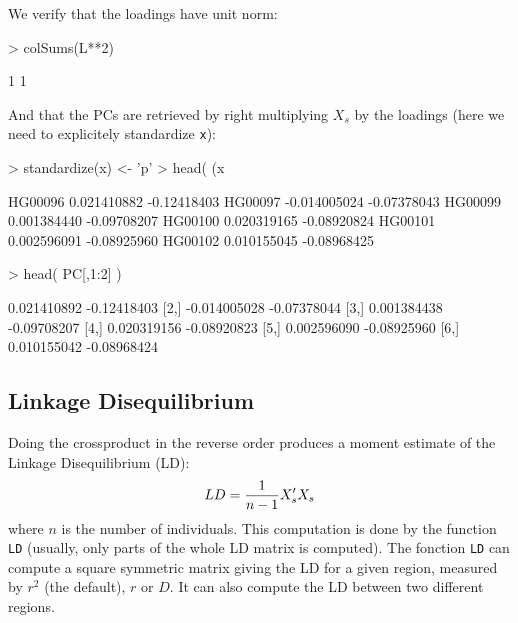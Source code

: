 \documentclass{article}
\renewenvironment{Schunk}{\vspace{\topsep}}{\vspace{\topsep}}
\begin{document}
We verify that the loadings have unit norm:
\begin{Schunk}
\begin{Sinput}
> colSums(L**2)
\end{Sinput}
\begin{Soutput}
[1] 1 1
\end{Soutput}
\end{Schunk}

And that the PCs are retrieved by right multiplying $X_s$ by the loadings (here we need 
to explicitely standardize \verb!x!):
\begin{Schunk}
\begin{Sinput}
> standardize(x) <- 'p'
> head( (x %
\end{Sinput}
\begin{Soutput}
                [,1]        [,2]
HG00096  0.021410882 -0.12418403
HG00097 -0.014005024 -0.07378043
HG00099  0.001384440 -0.09708207
HG00100  0.020319165 -0.08920824
HG00101  0.002596091 -0.08925960
HG00102  0.010155045 -0.08968425
\end{Soutput}
\begin{Sinput}
> head( PC[,1:2] )
\end{Sinput}
\begin{Soutput}
             [,1]        [,2]
[1,]  0.021410892 -0.12418403
[2,] -0.014005028 -0.07378044
[3,]  0.001384438 -0.09708207
[4,]  0.020319156 -0.08920823
[5,]  0.002596090 -0.08925960
[6,]  0.010155042 -0.08968424
\end{Soutput}
\end{Schunk}


\vfill\eject
\subsection{Linkage Disequilibrium}

  Doing the crossproduct in the reverse order produces a moment estimate of the 
  Linkage Disequilibrium (LD):
  \begin{equation*} 
    LD = {1\over n-1} X_s'X_s 
  \end{equation*}
  where $n$ is the number of individuals. This computation is done by the function
  \verb!LD! (usually, only parts of the whole LD matrix is computed).  
  The fonction \verb!LD! can compute a square symmetric matrix giving the LD for a given 
  region, measured by $r^2$ (the default), $r$ or $D$. It can also compute the LD  between
  two different regions.
\end{document}
